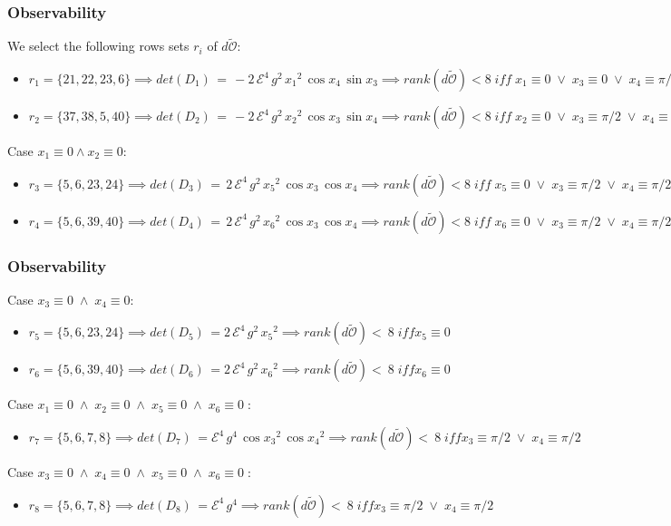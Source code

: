 \begin{frame}
\frametitle{Observability}
We select the following rows sets $r_i$ of $d\tilde{\mathcal{O}}$:
\begin{itemize}
	\item $r_1 = \{21,22,23,6\} \implies det(D_1)\,=\,-2\,\mathcal{E}^4\,g^2\,{x_{1}}^2\,\cos x_{4}\,\sin x_{3} \implies rank(d\tilde{\mathcal{O}})<8\; \mathit{iff} \;x_1\equiv0\; \lor\; x_3\equiv0\; \lor\; x_4\equiv\pi/2$
	\item $r_2 = \{37,38,5,40\} \implies det(D_2)\,=\,-2\,\mathcal{E}^4\,g^2\,{x_{2}}^2\,\cos x_{3}\,\sin x_{4} \implies rank(d\tilde{\mathcal{O}})<8\; \mathit{iff} \;x_2\equiv0\; \lor\; x_3\equiv\pi/2\; \lor\; x_4\equiv0$
	\end{itemize}
	Case $x_1 \equiv 0 \land x_2 \equiv 0$:
	\begin{itemize}
	\item $r_3 = \{5,6,23,24\} \implies det(D_3)\,=\,2\,\mathcal{E}^4\,g^2\,{x_{5}}^2\,\cos x_{3}\,\cos x_{4} \implies rank(d\tilde{\mathcal{O}})<8\; \mathit{iff} \;x_5\equiv0\; \lor\; x_3\equiv\pi/2\; \lor\; x_4\equiv\pi/2$
	\item $r_4 = \{5,6,39,40\} \implies det(D_4)\,=\,2\,\mathcal{E}^4\,g^2\,{x_{6}}^2\,\cos x_{3}\,\cos x_{4} \implies rank(d\tilde{\mathcal{O}})<8\; \mathit{iff} \;x_6\equiv0\; \lor\; x_3\equiv\pi/2\; \lor\; x_4\equiv\pi/2$
	\end{itemize}
\end{frame}
%
\begin{frame}
\frametitle{Observability}
	Case $x_3 \equiv 0\; \land\; x_4 \equiv 0$:
	\begin{itemize}
	\item $r_5 = \{5,6,23,24\} \implies det(D_5)\,=2\,\mathcal{E}^4\,g^2\,{x_{5}}^2 \implies rank(d\tilde{\mathcal{O}})<~8\; \mathit{iff} x_5\equiv0$
	\item $r_6 = \{5,6,39,40\} \implies det(D_6)\,=2\,\mathcal{E}^4\,g^2\,{x_{6}}^2 \implies rank(d\tilde{\mathcal{O}})<~8\; \mathit{iff} x_6\equiv0$
	\end{itemize}
	Case $x_1 \equiv 0\; \land\; x_2 \equiv 0\; \land\; x_5 \equiv 0\; \land\; x_6 \equiv 0\;$:
	\begin{itemize}
	\item $r_7 = \{5,6,7,8\} \implies det(D_7)\,=\mathcal{E}^4\,g^4\,{\cos x_{3}}^2\,{\cos x_{4}}^2 \implies rank(d\tilde{\mathcal{O}})<~8\; \mathit{iff} x_3\equiv\pi/2\; \lor\; x_4\equiv\pi/2$
	\end{itemize}
	Case $x_3 \equiv 0\; \land\; x_4 \equiv 0\; \land\; x_5 \equiv 0\; \land\; x_6 \equiv 0\;$:
	\begin{itemize}
	\item $r_8 = \{5,6,7,8\} \implies det(D_8)\,=\mathcal{E}^4\,g^4 \implies rank(d\tilde{\mathcal{O}})<~8\; \mathit{iff} x_3\equiv\pi/2\; \lor\; x_4\equiv\pi/2$
	\end{itemize}

\end{frame}
